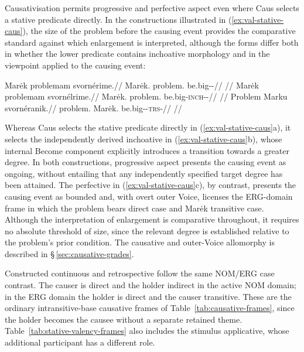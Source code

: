Causativisation permits progressive and perfective aspect even where Caus
selects a stative predicate directly. In the constructions illustrated in
(\ref{ex:val-stative-caus}), the size of the problem before the causing
event provides the comparative standard against which enlargement is
interpreted, although the forms differ both in whether the lower predicate
contains inchoative morphology and in the viewpoint applied to the causing
event:

\pex\label{ex:val-stative-caus}
\a
\begingl
\gla Marėk problemam svornérime.//
\glb Marėk.\Dir{} problem.\Ind{} be.big-\Caus{}-\Prog{}//
\glft {}//
\endgl
\a\label{ex:stative-caus-scope}%
\begingl
\gla Marėk problemam svornélrime.//
\glb Marėk.\Dir{} problem.\Ind{} be.big-\textsc{inch}-\Caus{}-\Prog{}//
\glft {}//
\endgl
\a
\begingl
\gla Problem Marku svornéranik.//
\glb problem.\Dir{} Marėk.\Trs{} be.big-\Caus{}-\textsc{trs}-\Pf{}//
\glft {}//
\endgl
\xe

Whereas Caus selects the stative predicate directly in
(\ref{ex:val-stative-caus}a), it selects the independently derived
inchoative  in (\ref{ex:val-stative-caus}b), whose internal
Become component explicitly introduces a transition towards a greater
degree. In both constructions, progressive aspect presents the causing
event as ongoing, without entailing that any independently specified
target degree has been attained. The perfective in
(\ref{ex:val-stative-caus}c), by contrast, presents the causing event as
bounded and, with overt outer Voice, licenses the ERG-domain frame in
which the problem bears direct case and Marėk transitive case. Although
the interpretation of enlargement is comparative throughout, it requires
no absolute threshold of size, since the relevant degree is established
relative to the problem's prior condition. The causative and outer-Voice
allomorphy is described in §\,\ref{sec:causative-grades}.

Constructed continuous   and
retrospective   follow the same
NOM/ERG case contrast. The causer is direct and the holder indirect in the
active NOM domain; in the ERG domain the holder is direct and the causer
transitive. These are the ordinary intransitive-base causative frames of
Table~\ref{tab:causative-frames}, since the holder becomes the causee
without a separate retained theme. Table~\ref{tab:stative-valency-frames}
also includes the stimulus applicative, whose additional participant has a
different role.

